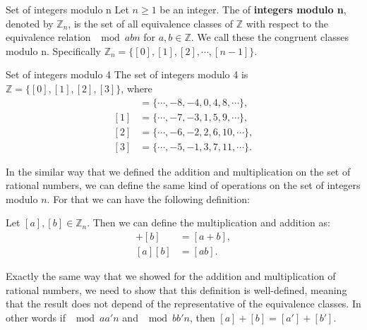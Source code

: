 \begin{defbox}{Set of integers modulo n}
	Let $n \geq 1$ be an integer. The of \textbf{integers modulo n}, denoted by $\mathbb{Z}_n$, is the set of all equivalence classes of $\mathbb{Z}$ with respect to the equivalence relation $\mod{a}{b}{n}$ for $a,b \in \mathbb{Z}$. We call these the congruent classes modulo n. Specifically $\mathbb{Z}_n = \{ [0],[1],[2],\cdots,[n-1] \}$.
\end{defbox}


\begin{example}{Set of integers modulo 4}
	The set of integers modulo 4 is $\mathbb{Z} = \{ [0],[1],[2],[3] \}$, where
	\begin{align*}
		[0] &= \{ \cdots,-8,-4,0,4,8,\cdots \},\\
		[1] &= \{ \cdots,-7,-3,1,5,9,\cdots \},\\
		[2] &= \{ \cdots,-6,-2,2,6,10,\cdots \},\\
		[3] &= \{ \cdots,-5,-1,3,7,11,\cdots \}.
	\end{align*}
\end{example}

In the similar way that we defined the addition and multiplication on the set of rational numbers, we can define the same kind of operations on the set of integers modulo $n$. For that we can have the following definition:

\begin{defbox}
	Let $[a], [b] \in \mathbb{Z}_n$. Then we can define the multiplication and addition as:
	\begin{align*}
		[a] + [b] &= [a+b], \\
		[a][b] &= [ab].
	\end{align*}
\end{defbox}

Exactly the same way that we showed for the addition and multiplication of rational numbers, we need to show that this definition is well-defined, meaning that the result does not depend of the representative of the equivalence classes. In other words if $\mod{a}{a'}{n}$ and $\mod{b}{b'}{n}$, then $[a] + [b] = [a'] + [b']$.